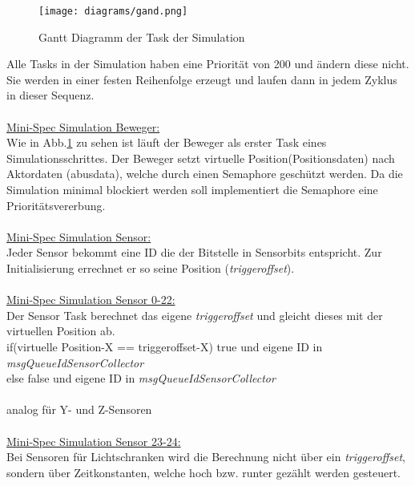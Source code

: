 \begin{figure}[H]
	\centering
  \texttt{[image: diagrams/gand.png]}
	\caption{Gantt Diagramm der Task der Simulation}
	\label{gantt}
\end{figure}

Alle Tasks in der Simulation haben eine Priorität von 200 und ändern diese nicht. Sie werden in einer festen Reihenfolge erzeugt und laufen dann in jedem Zyklus in dieser Sequenz.\\
\\

\underline{Mini-Spec Simulation Beweger:}\\
Wie in Abb.\ref{gantt} zu sehen ist läuft der Beweger als erster Task eines Simulationsschrittes.
Der Beweger setzt virtuelle Position(Positionsdaten) nach Aktordaten (abusdata), welche durch einen Semaphore geschützt werden.  Da die Simulation minimal blockiert werden soll implementiert die Semaphore eine Prioritätsvererbung.\\ \\


\underline{Mini-Spec Simulation Sensor:}\\
Jeder Sensor bekommt eine ID die der Bitstelle in Sensorbits entspricht. Zur Initialisierung errechnet er so seine Position (\textit{triggeroffset}).\\ \\

\underline{Mini-Spec Simulation Sensor 0-22:}\\
Der Sensor Task berechnet das eigene \textit{triggeroffset} und gleicht dieses mit der virtuellen Position ab.\\
if(virtuelle Position-X == triggeroffset-X) true und eigene ID in \textit{msgQueueIdSensorCollector\\}
else false und eigene ID in \textit{msgQueueIdSensorCollector\\} \\
analog für Y- und Z-Sensoren\\ \\

\underline{Mini-Spec Simulation Sensor 23-24:}\\
Bei Sensoren für Lichtschranken wird die Berechnung nicht über ein \textit{triggeroffset}, sondern über Zeitkonstanten, welche hoch bzw. runter gezählt werden gesteuert.\\

